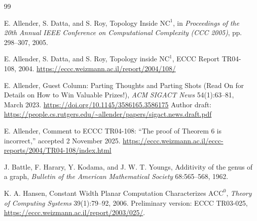 \documentclass[11pt]{article}
\theoremstyle{definition}
\begin{document}
\begin{thebibliography}{99}

E. Allender, S. Datta, and S. Roy,
\newblock Topology Inside $\mathrm{NC}^1$,
\newblock in \emph{Proceedings of the 20th Annual IEEE Conference on Computational Complexity (CCC 2005)}, pp. 298--307, 2005.

E. Allender, S. Datta, and S. Roy,
\newblock Topology inside $\mathrm{NC}^1$,
\newblock ECCC Report TR04-108, 2004.
\newblock \url{https://eccc.weizmann.ac.il/report/2004/108/}

E. Allender,
\newblock Guest Column: Parting Thoughts and Parting Shots (Read On for Details on How to Win Valuable Prizes!),
\newblock \emph{ACM SIGACT News} 54(1):63--81, March 2023.
\newblock \url{https://doi.org/10.1145/3586165.3586175}
\newblock Author draft: \url{https://people.cs.rutgers.edu/~allender/papers/sigact.news.draft.pdf}

E. Allender,
\newblock Comment to ECCC TR04-108: ``The proof of Theorem 6 is incorrect,''
\newblock accepted 2 November 2025.
\newblock \url{https://eccc.weizmann.ac.il/eccc-reports/2004/TR04-108/index.html}

J. Battle, F. Harary, Y. Kodama, and J. W. T. Youngs,
\newblock Additivity of the genus of a graph,
\newblock \emph{Bulletin of the American Mathematical Society} 68:565--568, 1962.

K. A. Hansen,
\newblock Constant Width Planar Computation Characterizes $\mathrm{ACC}^0$,
\newblock \emph{Theory of Computing Systems} 39(1):79--92, 2006.
\newblock Preliminary version: ECCC TR03-025,
\url{https://eccc.weizmann.ac.il/report/2003/025/}.

\end{thebibliography}
\end{document}
